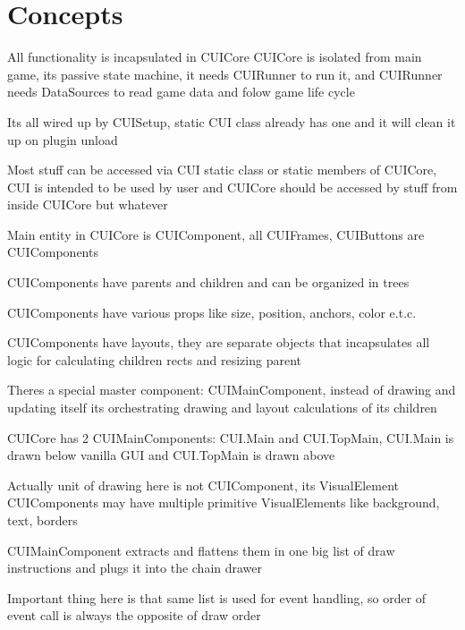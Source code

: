 \chapter{Concepts }
\hypertarget{_concepts}{}\label{_concepts}
\label{_concepts_md__docs_sources_2_sources_2_overview_2_concepts}%
%


All functionality is incapsulated in CUICore CUICore is isolated from main game, it\textquotesingle{}s passive state machine, it needs CUIRunner to run it, and CUIRunner needs Data\+Sources to read game data and folow game life cycle

It\textquotesingle{}s all wired up by CUISetup, static CUI class already has one and it will clean it up on plugin unload

Most stuff can be accessed via CUI static class or static members of CUICore, CUI is intended to be used by user and CUICore should be accessed by stuff from inside CUICore but whatever

Main entity in CUICore is CUIComponent, all CUIFrames, CUIButtons are CUIComponents

CUIComponents have parents and children and can be organized in trees

CUIComponents have various props like size, position, anchors, color e.\+t.\+c.

CUIComponents have layouts, they are separate objects that incapsulates all logic for calculating children rects and resizing parent

There\textquotesingle{}s a special master component:\+ CUIMain\+Component, instead of drawing and updating itself it\textquotesingle{}s orchestrating drawing and layout calculations of it\textquotesingle{}s children

CUICore has 2 CUIMain\+Components:\+ CUI.\+Main and CUI.\+Top\+Main, CUI.\+Main is drawn below vanilla GUI and CUI.\+Top\+Main is drawn above

Actually unit of drawing here is not CUIComponent, it\textquotesingle{}s Visual\+Element CUIComponents may have multiple primitive Visual\+Elements like background, text, borders

CUIMain\+Component extracts and flattens them in one big list of draw instructions and plugs it into the chain drawer

Important thing here is that same list is used for event handling, so order of event call is always the opposite of draw order 